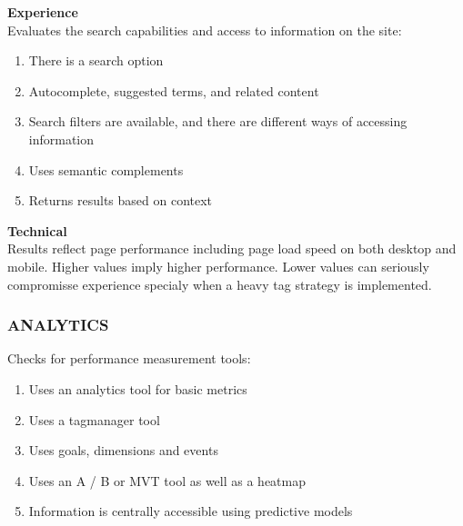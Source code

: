 \begin{multicols}{2}
\textbf{\large{Experience}}\\
Evaluates the search capabilities and access to information on the site: 
\begin{enumerate}[noitemsep]
  \item There is a search option 
  \item Autocomplete, suggested terms, and related content
  \item Search filters are available, and there are different ways of accessing information
  \item Uses semantic complements
  \item Returns results based on context
\end{enumerate}

\textbf{\large{Technical}}\\
Results reflect page performance including page load speed on both desktop and mobile. Higher values imply higher performance. Lower values can seriously compromisse experience specialy when a heavy tag strategy is implemented.

\subsubsection{ANALYTICS}
Checks for performance measurement tools: 
\begin{enumerate}[noitemsep]
  \item Uses an analytics tool for basic metrics 
  \item Uses a tagmanager tool
  \item Uses goals, dimensions and events
  \item Uses an A / B or MVT tool as well as a heatmap
  \item Information is centrally accessible using predictive models
\end{enumerate}
\end{multicols}

\newpage